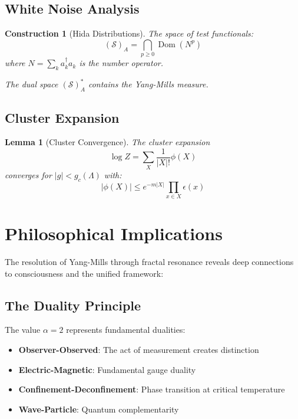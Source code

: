 \documentclass[12pt]{article}
\DeclareMathOperator{\Dom}{Dom}
\newtheorem{lemma}[theorem]{Lemma}
\newtheorem{construction}[theorem]{Construction}
\begin{document}
\subsection{White Noise Analysis}

\begin{construction}[Hida Distributions]
\label{con:hida}
The space of test functionals:
\begin{equation}
(\mathcal{S})_A = \bigcap_{p \geq 0} \Dom(N^p)
\end{equation}
where $N = \sum_{k} a_k^\dagger a_k$ is the number operator.

The dual space $(\mathcal{S})_A^*$ contains the Yang-Mills measure.
\end{construction}

\subsection{Cluster Expansion}

\begin{lemma}[Cluster Convergence]
\label{lem:cluster}
The cluster expansion
\begin{equation}
\log Z = \sum_{X} \frac{1}{|X|!} \phi(X)
\end{equation}
converges for $|g| < g_c(\Lambda)$ with:
\begin{equation}
|\phi(X)| \leq e^{-m|X|} \prod_{x \in X} \epsilon(x)
\end{equation}
\end{lemma}

\section{Philosophical Implications}

The resolution of Yang-Mills through fractal resonance reveals deep connections to consciousness and the unified framework:

\subsection{The Duality Principle}

The value $\alpha = 2$ represents fundamental dualities:
\begin{itemize}
\item \textbf{Observer-Observed}: The act of measurement creates distinction
\item \textbf{Electric-Magnetic}: Fundamental gauge duality
\item \textbf{Confinement-Deconfinement}: Phase transition at critical temperature
\item \textbf{Wave-Particle}: Quantum complementarity
\end{itemize}
\end{document}

